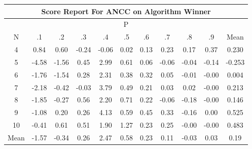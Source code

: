 \documentclass[11pt,a4paper]{report}
\begin{document}
\begin{longtable}{ | c || c | c | c | c | c | c | c | c | c || c |}
\hline
\multicolumn{11}{|c|}{ Score Report For ANCC on Algorithm Winner} \\
\hline
\multicolumn{11}{|c|}{ P } \\
\hline
N & .1 & .2 & .3 & .4 & .5 & .6 & .7 & .8 & .9 & Mean\\
 \hline
 \hline
 \endhead
  4 &  \cellcolor[HTML]{E7E7FF} 0.84 &  \cellcolor[HTML]{EFEFFF} 0.60 &  \cellcolor[HTML]{FFF7F7} -0.24 &  \cellcolor[HTML]{FFFFFF} -0.06 &  \cellcolor[HTML]{FFFFFF} 0.02 &  \cellcolor[HTML]{FFFFFF} 0.13 &  \cellcolor[HTML]{F7F7FF} 0.23 &  \cellcolor[HTML]{F7F7FF} 0.17 &  \cellcolor[HTML]{F7F7FF} 0.37 & 0.230 \\
  5 &  \cellcolor[HTML]{FF8F8F} -4.58 &  \cellcolor[HTML]{FFD7D7} -1.56 &  \cellcolor[HTML]{F7F7FF} 0.45 &  \cellcolor[HTML]{B7B7FF} 2.99 &  \cellcolor[HTML]{EFEFFF} 0.61 &  \cellcolor[HTML]{FFFFFF} 0.06 &  \cellcolor[HTML]{FFFFFF} -0.06 &  \cellcolor[HTML]{FFFFFF} -0.04 &  \cellcolor[HTML]{FFFFFF} -0.14 & -0.253 \\
  6 &  \cellcolor[HTML]{FFCFCF} -1.76 &  \cellcolor[HTML]{FFD7D7} -1.54 &  \cellcolor[HTML]{F7F7FF} 0.28 &  \cellcolor[HTML]{C7C7FF} 2.31 &  \cellcolor[HTML]{F7F7FF} 0.38 &  \cellcolor[HTML]{F7F7FF} 0.32 &  \cellcolor[HTML]{FFFFFF} 0.05 &  \cellcolor[HTML]{FFFFFF} -0.01 &  \cellcolor[HTML]{FFFFFF} -0.00 & 0.004 \\
  7 &  \cellcolor[HTML]{FFC7C7} -2.18 &  \cellcolor[HTML]{FFF7F7} -0.42 &  \cellcolor[HTML]{FFFFFF} -0.03 &  \cellcolor[HTML]{9F9FFF} 3.79 &  \cellcolor[HTML]{EFEFFF} 0.49 &  \cellcolor[HTML]{F7F7FF} 0.21 &  \cellcolor[HTML]{FFFFFF} 0.03 &  \cellcolor[HTML]{FFFFFF} 0.02 &  \cellcolor[HTML]{FFFFFF} -0.00 & 0.213 \\
  8 &  \cellcolor[HTML]{FFCFCF} -1.85 &  \cellcolor[HTML]{FFF7F7} -0.27 &  \cellcolor[HTML]{EFEFFF} 0.56 &  \cellcolor[HTML]{C7C7FF} 2.20 &  \cellcolor[HTML]{EFEFFF} 0.71 &  \cellcolor[HTML]{F7F7FF} 0.22 &  \cellcolor[HTML]{FFFFFF} -0.06 &  \cellcolor[HTML]{FFF7F7} -0.18 &  \cellcolor[HTML]{FFFFFF} -0.00 & 0.146 \\
  9 &  \cellcolor[HTML]{FFE7E7} -1.08 &  \cellcolor[HTML]{F7F7FF} 0.20 &  \cellcolor[HTML]{F7F7FF} 0.26 &  \cellcolor[HTML]{9797FF} 4.13 &  \cellcolor[HTML]{EFEFFF} 0.59 &  \cellcolor[HTML]{F7F7FF} 0.45 &  \cellcolor[HTML]{F7F7FF} 0.33 &  \cellcolor[HTML]{FFFFFF} -0.16 &  \cellcolor[HTML]{FFFFFF} 0.00 & 0.525 \\
  10 &  \cellcolor[HTML]{FFF7F7} -0.41 &  \cellcolor[HTML]{EFEFFF} 0.61 &  \cellcolor[HTML]{EFEFFF} 0.51 &  \cellcolor[HTML]{CFCFFF} 1.90 &  \cellcolor[HTML]{DFDFFF} 1.27 &  \cellcolor[HTML]{F7F7FF} 0.23 &  \cellcolor[HTML]{F7F7FF} 0.25 &  \cellcolor[HTML]{FFFFFF} -0.00 &  \cellcolor[HTML]{FFFFFF} -0.00 & 0.483 \\
 \hline
 \hline
Mean &  \cellcolor[HTML]{FFD7D7} -1.57 &  \cellcolor[HTML]{FFF7F7} -0.34 &  \cellcolor[HTML]{F7F7FF} 0.26 &  \cellcolor[HTML]{BFBFFF} 2.47 &  \cellcolor[HTML]{EFEFFF} 0.58 &  \cellcolor[HTML]{F7F7FF} 0.23 &  \cellcolor[HTML]{FFFFFF} 0.11 &  \cellcolor[HTML]{FFFFFF} -0.03 &  \cellcolor[HTML]{FFFFFF} 0.03 &  \cellcolor[HTML]{F7F7FF} 0.19
\end{longtable}
\end{document}
